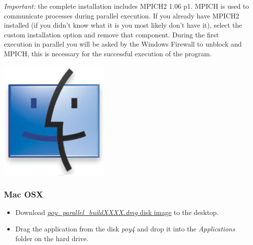 \begin{flushleft}
\begin{itemize}
                \emph{Important:} the complete installation includes MPICH2 1.06 p1. MPICH is used to communicate processes during parallel execution. If you already have MPICH2 installed (if you didn't know what it is you most likely don't have it), select the custom installation option and remove that component. During the first execution in parallel you will be asked by the Windows Firewall to unblock \poy and MPICH, this is necessary for the successful execution of the program.
		\end{itemize}

	\begin{minipage}[c]{0.074\textwidth}
   		\includegraphics[width=\textwidth]{doc/figures/figlogomac.jpg}
	\end{minipage}
	\quad
	\begin{minipage}[t]{0.88\textwidth}
	   	\subsubsection{Mac OSX}
	\end{minipage}
	            \begin{itemize}
			\item Download
            \href{http://research.amnh.org/scicomp/projects/poy.php}{\emph{poy\_parallel\_buildXXXX.dmg} disk image} to the desktop.
            		\item Drag the \poy application from the
            disk \emph{poy4} and drop it into the \emph{Applications}
            folder on the hard drive.
		\end{itemize}


\end{flushleft}
